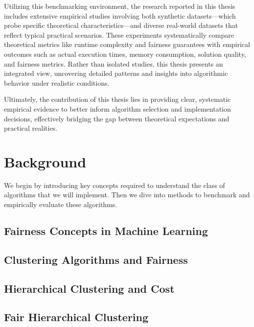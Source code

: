 \documentclass[12pt,twoside]{reedthesis}
\begin{document}
Utilizing this benchmarking environment, the research reported in
this thesis includes extensive empirical studies involving both
synthetic datasets—which probe specific theoretical
characteristics—and diverse real-world datasets that reflect typical
practical scenarios. These experiments systematically compare
theoretical metrics like runtime complexity
and fairness guarantees with empirical outcomes such as actual
execution times, memory consumption, solution quality, and fairness
metrics. Rather than isolated studies, this thesis presents an
integrated view, uncovering detailed patterns and insights into
algorithmic behavior under realistic conditions.

Ultimately, the contribution of this thesis lies in providing clear,
systematic empirical evidence to better inform algorithm selection
and implementation decisions, effectively bridging the gap between
theoretical expectations and practical realities.

\chapter{Background}
We begin by introducing key concepts required to understand the class
of algorithms that we will implement. Then we dive into methods to
benchmark and empirically evaluate these algorithms.

\section{Fairness Concepts in Machine Learning}\label{sec:fairness_concepts}


\section{Clustering Algorithms and Fairness}\label{sec:fair_clustering}


\section{Hierarchical Clustering and Cost}


\section{Fair Hierarchical
Clustering}\label{subsec:fair_hierarchical_clustering}

\end{document}
